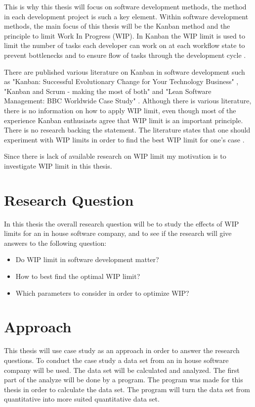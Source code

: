 \documentclass[UKenglish]{ifimaster}  %
\begin{document}
This is why this thesis will focus on software development methods, the method in each development project is such a key element. Within software development methods, the main focus of this thesis will be the Kanban method and the principle to limit Work In Progress (WIP). In Kanban the WIP limit is used to  limit the number of tasks each developer can work on at each workflow state to prevent bottlenecks and to ensure flow of tasks through the development cycle \parencite{gandomani2013important} \parencite{ikonen2010exploring}.

There are published various literature on Kanban in software development such as "Kanban: Successful Evolutionary Change for Your Technology Business" \parencite{0984521402}, "Kanban and Scrum - making the most of both"  \parencite{Kniberg} and "Lean Software Management: BBC Worldwide Case Study" \parencite{Joyce}. Although there is various literature, there is no information on how to apply WIP limit, even though most of the experience Kanban enthusiasts agree that WIP limit is an important principle.  There is no research backing the statement.  The literature states that one should experiment with WIP limits in order to find the best WIP limit for one's case \parencite{Ikonen} \parencite{Kniberg}.

Since there is lack of available research on WIP limit my motivation is to investigate WIP limit in this thesis.

\section{Research Question}
\label{chap:RQ}
In this thesis the overall research question will be to study the effects of WIP limits for an in house software company, and to see if the research will give answers to the following question:
\begin{itemize}
\item Do WIP limit in software development matter?
\item How to best find the optimal WIP limit?
\item Which parameters to consider in order to optimize WIP? 
\end{itemize}


\section{Approach}
This thesis will use case study as an approach in order to answer the research questions. To conduct the case study a data set from an in house software company will be used.  The data set will be calculated and analyzed. The first part of the analyze will be done by a program. The program was made for this thesis in order to calculate the data set. The program will turn the data set from quantitative into more suited quantitative data set. 
\end{document}

